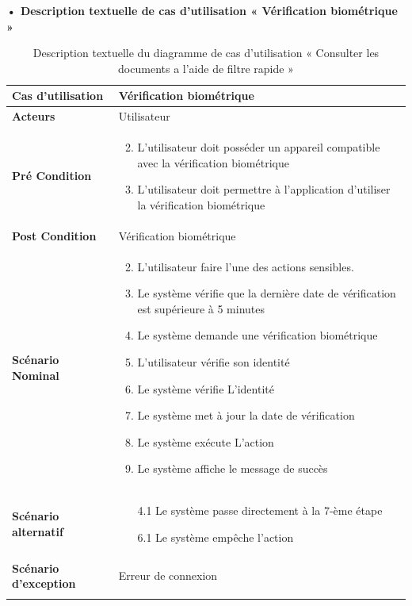 \textbf{•	Description textuelle de cas d'utilisation « Vérification biométrique  »}

\begin{longtable}{|p{5cm}|p{10cm}|}
\hline
\textbf{Cas d'utilisation}&Vérification biométrique \\
\hline
\textbf{Acteurs}&Utilisateur \\
\hline
\textbf{Pré Condition}&
\vspace{-\baselineskip}
\begin{enumerate}
  \setcounter{enumi}{1}
  \item L’utilisateur doit posséder un appareil compatible avec la vérification biométrique
  \item L’utilisateur doit permettre à l’application d’utiliser la vérification biométrique
\end{enumerate}\\
\hline
\textbf{Post Condition}&Vérification biométrique\\
\hline
\textbf{Scénario Nominal}&
\vspace{-\baselineskip}
\begin{enumerate}
    \setcounter{enumi}{1}
    \item L’utilisateur faire l’une des actions sensibles.
    \item Le système vérifie que la dernière date de vérification est supérieure à 5 minutes 
    \item Le système demande une vérification biométrique
    \item L’utilisateur vérifie son identité
    \item Le système vérifie L’identité 
    \item Le système met à jour la date de vérification
    \item Le système exécute L’action
    \item Le système affiche le message de succès
    
\end{enumerate}\\
\hline
\textbf{Scénario alternatif}&
\vspace{-\baselineskip}
\begin{enumerate}
  \item [4.1] Le système passe directement à la 7-ème étape 
  \item [6.1] Le système empêche l’action  
\end{enumerate}\\
\hline
\textbf{Scénario d'exception}&Erreur de connexion\\
\hline
\caption{Description textuelle du diagramme de cas d'utilisation « Consulter les documents a l'aide de filtre rapide »}
\label{tab:use_case_biometric_verification}
\end{longtable}

